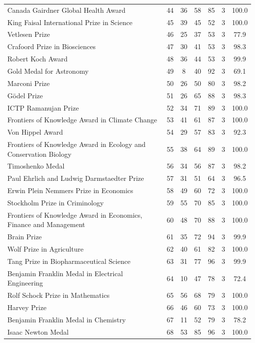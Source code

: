\begin{longtable}{>{\raggedright\arraybackslash}p{6.6cm}cccccc}
Canada Gairdner Global Health Award & 44 & 36 & 58 & 85 & 3 & 100.0 \\ 
King Faisal International Prize in Science & 45 & 39 & 45 & 52 & 3 & 100.0 \\ 
Vetlesen Prize & 46 & 25 & 37 & 53 & 3 & 77.9 \\ 
Crafoord Prize in Biosciences & 47 & 30 & 41 & 53 & 3 & 98.3 \\ 
Robert Koch Award & 48 & 36 & 44 & 53 & 3 & 99.9 \\ 
Gold Medal for Astronomy & 49 & 8 & 40 & 92 & 3 & 69.1 \\ 
Marconi Prize & 50 & 26 & 50 & 80 & 3 & 98.2 \\ 
Gödel Prize & 51 & 26 & 65 & 88 & 3 & 98.3 \\ 
ICTP Ramanujan Prize & 52 & 34 & 71 & 89 & 3 & 100.0 \\ 
Frontiers of Knowledge Award in Climate Change & 53 & 41 & 61 & 87 & 3 & 100.0 \\ 
Von Hippel Award & 54 & 29 & 57 & 83 & 3 & 92.3 \\ 
Frontiers of Knowledge Award in Ecology and Conservation Biology & 55 & 38 & 64 & 89 & 3 & 100.0 \\ 
Timoshenko Medal & 56 & 34 & 56 & 87 & 3 & 98.2 \\ 
Paul Ehrlich and Ludwig Darmstaedter Prize & 57 & 31 & 51 & 64 & 3 & 96.5 \\ 
Erwin Plein Nemmers Prize in Economics & 58 & 49 & 60 & 72 & 3 & 100.0 \\ 
Stockholm Prize in Criminology & 59 & 55 & 70 & 85 & 3 & 100.0 \\ 
Frontiers of Knowledge Award in Economics, Finance and Management & 60 & 48 & 70 & 88 & 3 & 100.0 \\ 
Brain Prize & 61 & 35 & 72 & 94 & 3 & 99.9 \\ 
Wolf Prize in Agriculture & 62 & 40 & 61 & 82 & 3 & 100.0 \\ 
Tang Prize in Biopharmaceutical Science & 63 & 31 & 77 & 96 & 3 & 99.9 \\ 
Benjamin Franklin Medal in Electrical Engineering & 64 & 10 & 47 & 78 & 3 & 72.4 \\ 
Rolf Schock Prize in Mathematics & 65 & 56 & 68 & 79 & 3 & 100.0 \\ 
Harvey Prize & 66 & 46 & 60 & 73 & 3 & 100.0 \\ 
Benjamin Franklin Medal in Chemistry & 67 & 11 & 52 & 79 & 3 & 78.2 \\ 
Isaac Newton Medal & 68 & 53 & 85 & 96 & 3 & 100.0 \\ 

\end{longtable}
